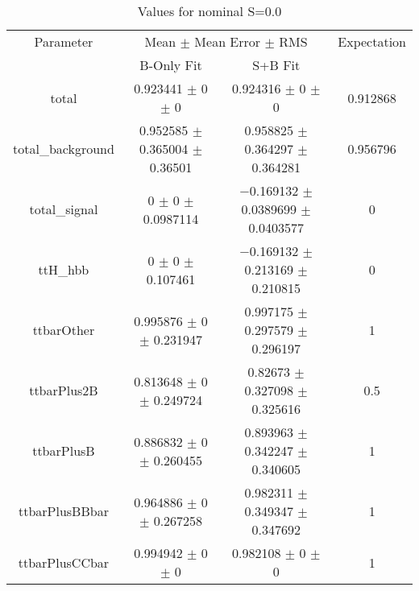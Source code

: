 \begin{table}
\centering
\caption{Values for nominal S=0.0}
\begin{tabular}{cccc}
\toprule
Parameter & \multicolumn{2}{c}{Mean $\pm$ Mean Error $\pm$ RMS} & Expectation\\
 & B-Only Fit & S+B Fit & \\
\midrule
total & \num{0.923441} $\pm$ \num{0} $\pm$ \num{0} & \num{0.924316} $\pm$ \num{0} $\pm$ \num{0} & \num{0.912868}\\
total\_background & \num{0.952585} $\pm$ \num{0.365004} $\pm$ \num{0.36501} & \num{0.958825} $\pm$ \num{0.364297} $\pm$ \num{0.364281} & \num{0.956796}\\
total\_signal & \num{0} $\pm$ \num{0} $\pm$ \num{0.0987114} & \num{-0.169132} $\pm$ \num{0.0389699} $\pm$ \num{0.0403577} & \num{0}\\
ttH\_hbb & \num{0} $\pm$ \num{0} $\pm$ \num{0.107461} & \num{-0.169132} $\pm$ \num{0.213169} $\pm$ \num{0.210815} & \num{0}\\
ttbarOther & \num{0.995876} $\pm$ \num{0} $\pm$ \num{0.231947} & \num{0.997175} $\pm$ \num{0.297579} $\pm$ \num{0.296197} & \num{1}\\
ttbarPlus2B & \num{0.813648} $\pm$ \num{0} $\pm$ \num{0.249724} & \num{0.82673} $\pm$ \num{0.327098} $\pm$ \num{0.325616} & \num{0.5}\\
ttbarPlusB & \num{0.886832} $\pm$ \num{0} $\pm$ \num{0.260455} & \num{0.893963} $\pm$ \num{0.342247} $\pm$ \num{0.340605} & \num{1}\\
ttbarPlusBBbar & \num{0.964886} $\pm$ \num{0} $\pm$ \num{0.267258} & \num{0.982311} $\pm$ \num{0.349347} $\pm$ \num{0.347692} & \num{1}\\
ttbarPlusCCbar & \num{0.994942} $\pm$ \num{0} $\pm$ \num{0} & \num{0.982108} $\pm$ \num{0} $\pm$ \num{0} & \num{1}\\
\bottomrule
\end{tabular}
\end{table}